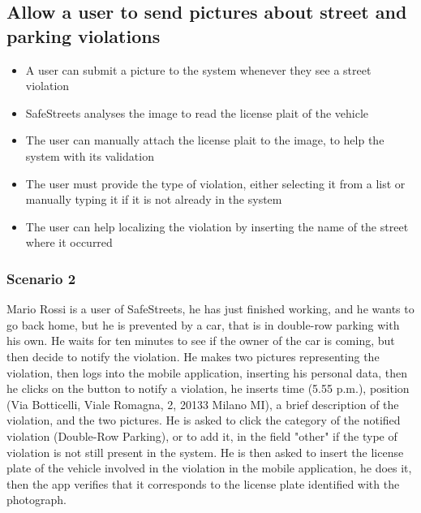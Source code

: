 \subsection{Allow a user to send pictures about street and parking violations}
\begin{itemize}
    \item A user can submit a picture to the system whenever they see a street violation
    \item SafeStreets analyses the image to read the license plait of the vehicle
    \item The user can manually attach the license plait to the image, to help the system with its validation
    \item The user must provide the type of violation, either selecting it from a list or manually typing it if it is not already in the system
    \item The user can help localizing the violation by inserting the name of the street where it occurred
\end{itemize}
\subsubsection{Scenario 2}
Mario Rossi is a user of SafeStreets, he has just finished working, and he wants to go back home, but he is prevented by a car, that is in double-row parking with his own. He waits for ten 
minutes to see if the owner of the car is coming, but then decide to notify the violation. He makes two pictures representing the violation, then logs into the mobile application, 
inserting his personal data, then he clicks on the button to notify a violation, he inserts time (5.55 p.m.), position (Via Botticelli, Viale Romagna, 2, 20133 Milano MI), a brief description 
of the violation, and the two pictures. He is asked to click the category of the notified violation (Double-Row Parking), or to add it, in the field "other" if the type of violation is not still 
present in the system. He is then asked to insert the license plate of the vehicle involved in the violation in the mobile application, he does it, then the app verifies that it 
corresponds to the license plate identified with the photograph.

